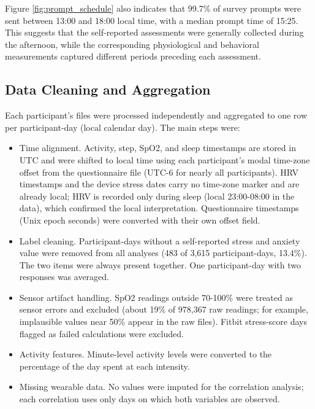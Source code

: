 \documentclass[11pt, a4paper, oneside]{article}
\begin{document}
Figure \ref{fig:prompt_schedule} also indicates that 99.7\% of survey prompts were sent between 13:00 and 18:00 local time, with a median prompt time of 15:25. This suggests that the self-reported assessments were generally collected during the afternoon, while the corresponding physiological and behavioral measurements captured different periods preceding each assessment.

\subsection{Data Cleaning and Aggregation}
Each participant's files were processed independently and aggregated to one row per participant-day (local calendar day). The main steps were:

\begin{itemize}
\item Time alignment. Activity, step, SpO2, and sleep timestamps are stored in UTC and were shifted to local time using each participant's modal time-zone offset from the questionnaire file (UTC-6 for nearly all participants). HRV timestamps and the device stress dates carry no time-zone marker and are already local; HRV is recorded only during sleep (local 23:00-08:00 in the data), which confirmed the local interpretation. Questionnaire timestamps (Unix epoch seconds) were converted with their own offset field.

\item Label cleaning. Participant-days without a self-reported stress and anxiety value were removed from all analyses (483 of 3,615 participant-days, 13.4\%). The two items were always present together. One participant-day with two responses was averaged.

\item Sensor artifact handling. SpO2 readings outside 70-100\% were treated as sensor errors and excluded (about 19\% of 978,367 raw readings; for example, implausible values near 50\% appear in the raw files). Fitbit stress-score days flagged as failed calculations were excluded.

\item Activity features. Minute-level activity levels were converted to the percentage of the day spent at each intensity.

\item Missing wearable data. No values were imputed for the correlation analysis; each correlation uses only days on which both variables are observed.
\end{itemize}
\end{document}

